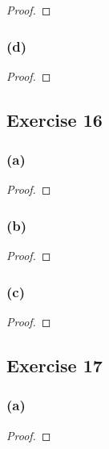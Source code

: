 \documentclass[14pt]{extarticle}
\begin{document}
\begin{proof}

\end{proof}

\subsubsection{(d)}

\begin{proof}

\end{proof}

\subsection{Exercise 16}

\subsubsection{(a)}

\begin{proof}

\end{proof}

\subsubsection{(b)}

\begin{proof}

\end{proof}

\subsubsection{(c)}

\begin{proof}

\end{proof}

\subsection{Exercise 17}

\subsubsection{(a)}

\begin{proof}

\end{proof}
\end{document}
